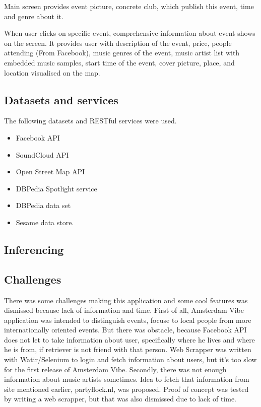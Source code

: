 \documentclass[12pt, a4paper, lithuanian]{article}
\begin{document}
  Main screen provides event picture, concrete club, which publish this event, time and genre about it.

  When user clicks on specific event, comprehensive information about event shows on the screen. It provides user with description of the event, price, people attending (From Facebook), music genres of the event, music artist list with embedded music samples, start time of the event, cover picture, place, and location visualised on the map.

\subsection{Datasets and services}

  The following datasets and RESTful services were used.

\begin{itemize}

  \item Facebook API

  \item SoundCloud API

  \item Open Street Map API

  \item DBPedia Spotlight service

  \item DBPedia data set

  \item Sesame data store.

\end{itemize}

\subsection{Inferencing}

\subsection{Challenges}

  There was some challenges making this application and some cool features was dismissed because lack of information and time. First of all, Amsterdam Vibe application was intended to distinguish events, focuse to local people from more internationally oriented events. But there was obstacle, because Facebook API does not let to take information about user, specifically where he lives and where he is from, if retriever is not friend with that person. Web Scrapper was written with Watir/Selenium to login and fetch information about users, but it's too slow for the first release of Amsterdam Vibe.
  Secondly, there was not enough information about music artists sometimes. Idea to fetch that information from site mentioned earlier, partyflock.nl, was proposed. Proof of concept was tested by writing a web scrapper, but that was also dismissed due to lack of time.
\end{document}
